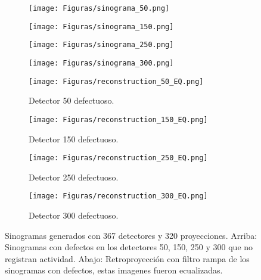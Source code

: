 \documentclass[letterpaper,12pt]{article}
\theoremstyle{plain}
\begin{document}
\begin{figure}[H]
   \centering
       \begin{subfigure}[h]{0.24\textwidth}
           \centering
           \texttt{[image: Figuras/sinograma\_50.png]} 
       \end{subfigure}
       \begin{subfigure}[h]{0.24\textwidth}
           \centering
           \texttt{[image: Figuras/sinograma\_150.png]}
       \end{subfigure}
       \begin{subfigure}[h]{0.24\textwidth}
           \centering
           \texttt{[image: Figuras/sinograma\_250.png]}
       \end{subfigure}
       \begin{subfigure}[h]{0.24\textwidth}
           \centering
           \texttt{[image: Figuras/sinograma\_300.png]}
       \end{subfigure}
        \begin{subfigure}[h]{0.24\textwidth}
           \centering
           \texttt{[image: Figuras/reconstruction\_50\_EQ.png]}
           \caption{Detector 50 defectuoso.} 
           \label{fig:sinograma_50}
        \end{subfigure}
        \begin{subfigure}[h]{0.24\textwidth}
           \centering
           \texttt{[image: Figuras/reconstruction\_150\_EQ.png]}
           \caption{Detector 150 defectuoso.} 
           \label{fig:sinograma_150}
        \end{subfigure}
        \begin{subfigure}[h]{0.24\textwidth}
           \centering
           \texttt{[image: Figuras/reconstruction\_250\_EQ.png]}
           \caption{Detector 250 defectuoso.}
           \label{fig:sinograma_250} 
        \end{subfigure}
        \begin{subfigure}[h]{0.24\textwidth}
           \centering
           \texttt{[image: Figuras/reconstruction\_300\_EQ.png]}
           \caption{Detector 300 defectuoso.}
           \label{fig:sinograma_300} 
        \end{subfigure}
   \caption{Sinogramas generados con 367 detectores y 320 proyecciones. Arriba: Sinogramas con defectos en los detectores 50, 150, 250 y 300 que no registran actividad. Abajo: Retroproyección con filtro rampa de los sinogramas con defectos, estas imagenes fueron ecualizadas.}
   \label{fig:detector_roto}
\end{figure}
\end{document}
